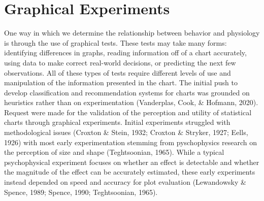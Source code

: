 \documentclass[print]{nuthesis}
\begin{document}
\hypertarget{graphical-experiments}{%
\section{Graphical Experiments}\label{graphical-experiments}}

One way in which we determine the relationship between behavior and physiology is through the use of graphical tests. These tests may take many forms: identifying differences in graphs, reading information
off of a chart accurately, using data to make correct real-world decisions, or predicting the next few observations.
All of these types of tests require different levels of use and manipulation of the information presented in the chart.
The initial push to develop classification and recommendation systems for charts was grounded on heuristics rather than on experimentation (Vanderplas, Cook, \& Hofmann, 2020).
Request were made for the validation of the perception and utility of statistical charts through graphical experiments.
Initial experiments struggled with methodological issues (Croxton \& Stein, 1932; Croxton \& Stryker, 1927; Eells, 1926) with most early experimentation stemming from pyschophysics research on the perception of size and shape (Teghtsoonian, 1965).
While a typical psychophysical experiment focuses on whether an effect is detectable and whether the magnitude of the effect can be accurately estimated, these early experiments instead depended on speed and accuracy for plot evaluation (Lewandowsky \& Spence, 1989; Spence, 1990; Teghtsoonian, 1965).
\end{document}
